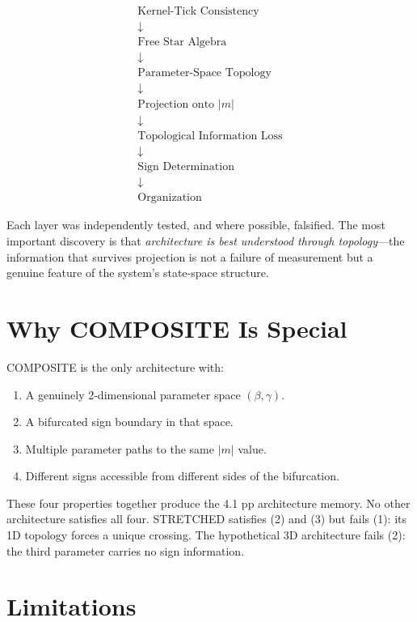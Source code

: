 \documentclass[11pt,a4paper,oneside]{report}
\begin{document}
\[
\begin{array}{c}
\text{Kernel-Tick Consistency}\\
\downarrow\\
\text{Free Star Algebra}\\
\downarrow\\
\text{Parameter-Space Topology}\\
\downarrow\\
\text{Projection onto } |m|\\
\downarrow\\
\text{Topological Information Loss}\\
\downarrow\\
\text{Sign Determination}\\
\downarrow\\
\text{Organization}
\end{array}
\]

Each layer was independently tested, and where possible, falsified.
The most important discovery is that \textit{architecture is best understood through topology}---the
information that survives projection is not a failure of measurement but a
genuine feature of the system's state-space structure.

\section{Why COMPOSITE Is Special}

COMPOSITE is the only architecture with:
\begin{enumerate}[nosep]
  \item A genuinely 2-dimensional parameter space $(\beta, \gamma)$.
  \item A bifurcated sign boundary in that space.
  \item Multiple parameter paths to the same $|m|$ value.
  \item Different signs accessible from different sides of the bifurcation.
\end{enumerate}

These four properties together produce the 4.1 pp architecture memory.
No other architecture satisfies all four. STRETCHED satisfies (2) and (3)
but fails (1): its 1D topology forces a unique crossing. The hypothetical
3D architecture fails (2): the third parameter carries no sign information.

\section{Limitations}
\end{document}
